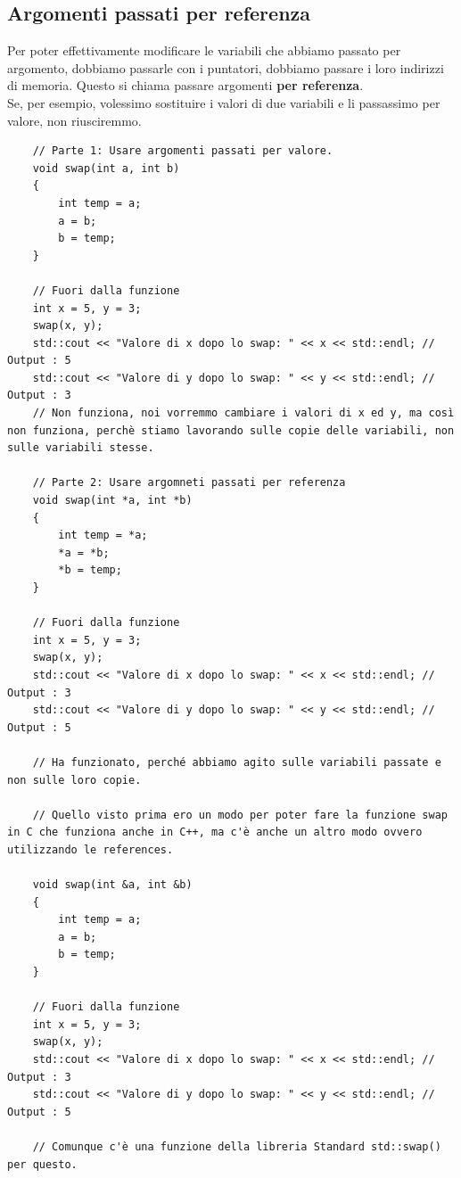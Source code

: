 \subsection{Argomenti passati per referenza}

\textsf{\small Per poter effettivamente modificare le variabili che abbiamo passato per argomento, dobbiamo passarle con i puntatori, dobbiamo passare i loro indirizzi di memoria. Questo si chiama passare argomenti \textbf{per referenza}.} \\

\textsf{\small Se, per esempio, volessimo sostituire i valori di due variabili e li passassimo per valore, non riusciremmo.} \\

\begin{lstlisting}
	// Parte 1: Usare argomenti passati per valore.
	void swap(int a, int b)
	{
		int temp = a;
		a = b;
		b = temp;
	}

	// Fuori dalla funzione
	int x = 5, y = 3;
	swap(x, y); 
	std::cout << "Valore di x dopo lo swap: " << x << std::endl; // Output : 5
	std::cout << "Valore di y dopo lo swap: " << y << std::endl; // Output : 3
	// Non funziona, noi vorremmo cambiare i valori di x ed y, ma così non funziona, perchè stiamo lavorando sulle copie delle variabili, non sulle variabili stesse.
	
	// Parte 2: Usare argomneti passati per referenza
	void swap(int *a, int *b)
	{
		int temp = *a;
		*a = *b;
		*b = temp;
	}

	// Fuori dalla funzione
	int x = 5, y = 3;
	swap(x, y);
	std::cout << "Valore di x dopo lo swap: " << x << std::endl; // Output : 3
	std::cout << "Valore di y dopo lo swap: " << y << std::endl; // Output : 5
	
	// Ha funzionato, perché abbiamo agito sulle variabili passate e non sulle loro copie.
	
	// Quello visto prima ero un modo per poter fare la funzione swap in C che funziona anche in C++, ma c'è anche un altro modo ovvero utilizzando le references.
	
	void swap(int &a, int &b)
	{
		int temp = a;
		a = b;
		b = temp;
	}

	// Fuori dalla funzione
	int x = 5, y = 3;
	swap(x, y);
	std::cout << "Valore di x dopo lo swap: " << x << std::endl; // Output : 3
	std::cout << "Valore di y dopo lo swap: " << y << std::endl; // Output : 5
	
	// Comunque c'è una funzione della libreria Standard std::swap() per questo.
\end{lstlisting}

